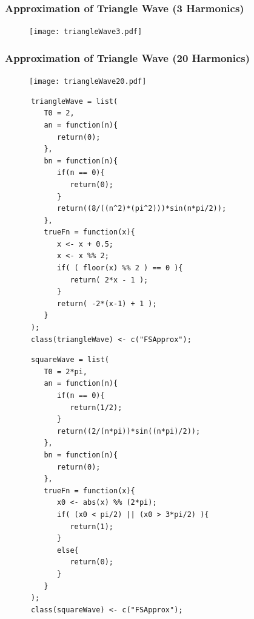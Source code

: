 \documentclass{beamer}
\begin{document}
\begin{frame}
   \frametitle{Approximation of Triangle Wave (3 Harmonics)}
   \begin{figure}
   \texttt{[image: triangleWave3.pdf]}
   \end{figure}
\end{frame}

\begin{frame}
   \frametitle{Approximation of Triangle Wave (20 Harmonics)}
   \begin{figure}
   \texttt{[image: triangleWave20.pdf]}
   \end{figure}
\end{frame}

\begin{frame}[fragile]
   \begin{center}
   \begin{minipage}{100mm}
   \begin{lstlisting}
      triangleWave = list(
         T0 = 2,
         an = function(n){
            return(0);
         },
         bn = function(n){
            if(n == 0){
               return(0);
            }
            return((8/((n^2)*(pi^2)))*sin(n*pi/2));
         },
         trueFn = function(x){
            x <- x + 0.5;
            x <- x %% 2;
            if( ( floor(x) %% 2 ) == 0 ){
               return( 2*x - 1 );
            }
            return( -2*(x-1) + 1 );
         }
      );
      class(triangleWave) <- c("FSApprox");
   \end{lstlisting}
   \end{minipage}
   \end{center}
\end{frame}

\begin{frame}[fragile]
   \begin{center}
   \begin{minipage}{100mm}
   \begin{lstlisting}
      squareWave = list(
         T0 = 2*pi,
         an = function(n){
            if(n == 0){
               return(1/2);
            }
            return((2/(n*pi))*sin((n*pi)/2));
         },
         bn = function(n){
            return(0);
         },
         trueFn = function(x){
            x0 <- abs(x) %% (2*pi);
            if( (x0 < pi/2) || (x0 > 3*pi/2) ){
               return(1);
            }
            else{
               return(0);
            }
         }
      );
      class(squareWave) <- c("FSApprox");
   \end{lstlisting}
   \end{minipage}
   \end{center}
\end{frame}
\end{document}
